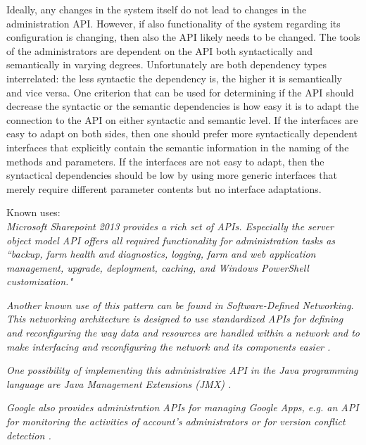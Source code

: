 Ideally, any changes in the system itself do not lead to changes in the administration API. However, if also functionality of the system regarding its configuration is changing, then also the API likely needs to be changed. The tools of the administrators are dependent on the API both syntactically and semantically in varying degrees. Unfortunately are both dependency types interrelated: the less syntactic the dependency is, the higher it is semantically and vice versa. One criterion that can be used for determining if the API should decrease the syntactic or the semantic dependencies is how easy it is to adapt the connection to the API on either syntactic and semantic level. If the interfaces are easy to adapt on both sides, then one should prefer more syntactically dependent interfaces that explicitly contain the semantic information in the naming of the methods and parameters. If the interfaces are not easy to adapt, then the syntactical dependencies should be low by using more generic interfaces that merely require different parameter contents but no interface adaptations.  


Known uses:\\
\textit{Microsoft Sharepoint 2013 provides a rich set of APIs. Especially the server object model API offers all required functionality for administration tasks as ``backup, farm health and diagnostics, logging, farm and web application management, upgrade, deployment, caching, and Windows PowerShell customization." \cite{Microsoft2013}} 

\textit{Another known use of this pattern can be found in Software-Defined Networking. This networking architecture is designed to use standardized APIs for defining and reconfiguring the way data and resources are handled within a network and to make interfacing and reconfiguring the network and its components easier \cite{Kirkpatrick2013}.}

\textit{One possibility of implementing this administrative API in the Java programming language are Java Management Extensions (JMX) \cite{Oracle2014}. }

\textit{Google also provides administration APIs for managing Google Apps, e.g. an API for monitoring the activities of account's administrators or for version conflict detection \cite{GoogleAppsPlatform2014}.}

%
%
%
